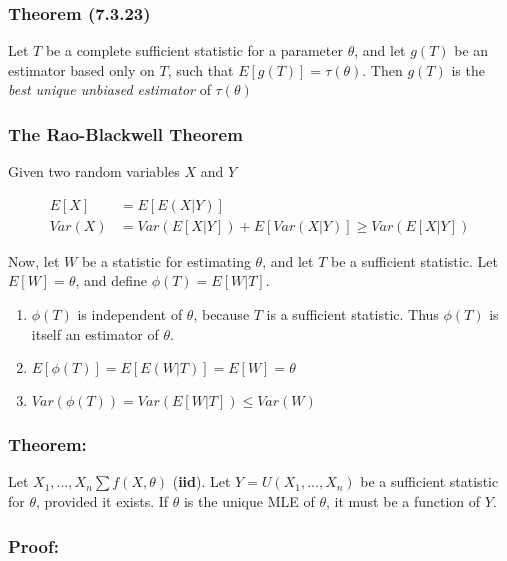 \documentclass{article}
\begin{document}
\subsubsection{Theorem (7.3.23)}

Let $T$ be a complete sufficient statistic for a parameter $\theta$, and let $g(T)$ be an estimator based only on $T$, such that $E[g(T)] = \tau(\theta)$. Then $g(T)$ is the \textit{best unique unbiased estimator} of $\tau(\theta)$


\subsubsection{The Rao-Blackwell Theorem}

Given two random variables $X$ and $Y$

\begin{equation*}
    \begin{split}
        E[X] &= E[E(X|Y)]\\
        Var(X) &= Var(E[X|Y]) + E[Var(X|Y)] \geq Var(E[X|Y])
    \end{split}
\end{equation*}

Now, let $W$ be a statistic for estimating $\theta$, and let $T$ be a sufficient statistic. Let $E[W] = \theta$, and define $\phi(T) = E[W|T]$.

\begin{enumerate}
    \item $\phi(T)$ is independent of $\theta$, because $T$ is a sufficient statistic. Thus $\phi(T)$ is itself an estimator of $\theta$.
    
    \item $E[\phi(T)] = E[E(W|T)] = E[W] = \theta$
    
    \item $Var(\phi(T)) = Var\left(E[W|T] \right)\leq Var(W)$
\end{enumerate}


\subsubsection{Theorem:}

Let $X_1,...,X_n \sum f(X,\theta)$ (\textbf{iid}). Let $Y = U(X_1,...,X_n)$ be a sufficient statistic for $\theta$, provided it exists. If $\hat{\theta}$ is the unique MLE of $\theta$, it must be a function of $Y$.

\subsubsection*{Proof:}
\end{document}
